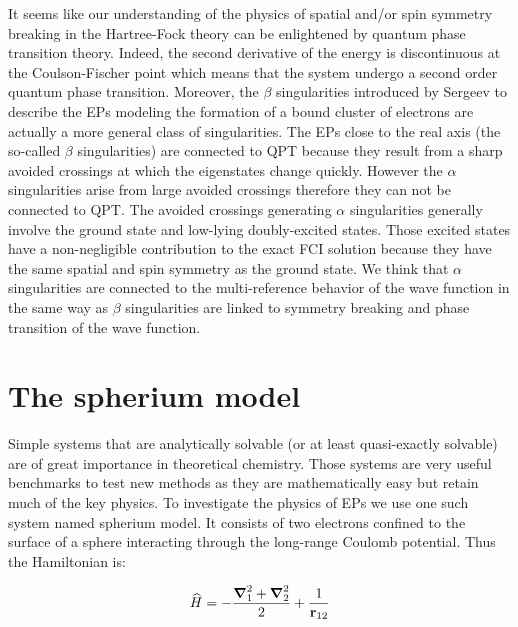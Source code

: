 \documentclass[11pt,a4paper]{article}
\begin{document}
{It seems like our understanding of the physics of spatial and/or spin symmetry breaking in the Hartree-Fock theory can be enlightened by quantum phase transition theory. Indeed, the second derivative of the energy is discontinuous at the Coulson-Fischer point which means that the system undergo a second order quantum phase transition. Moreover, the $\beta$ singularities introduced by Sergeev to describe the EPs modeling the formation of a bound cluster of electrons are actually a more general class of singularities. The EPs close to the real axis (the so-called $\beta$ singularities) are connected to QPT because they result from a sharp avoided crossings at which the eigenstates change quickly. However the $\alpha$ singularities arise from large avoided crossings therefore they can not be connected to QPT. The avoided crossings generating $\alpha$ singularities generally involve the ground state and low-lying doubly-excited states. Those excited states have a non-negligible contribution to the exact FCI solution because they have the same spatial and spin symmetry as the ground state. We think that $\alpha$ singularities are connected to the multi-reference behavior of the wave function in the same way as $\beta$ singularities are linked to symmetry breaking and phase transition of the wave function. 

\section{The spherium model}

Simple systems that are analytically solvable (or at least quasi-exactly solvable) are of great importance in theoretical chemistry. Those systems are very useful benchmarks to test new methods as they are mathematically easy but retain much of the key physics. To investigate the physics of EPs we use one such system named spherium model. It consists of two electrons confined to the surface of a sphere interacting through the long-range Coulomb potential. Thus the Hamiltonian is:

\begin{equation}
\widehat{H} = -\frac{\grad_1^2 + \grad_2^2}{2} + \frac{1}{\vb{r}_{12}}
\end{equation}

}
\end{document}
